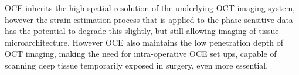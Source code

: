 OCE inherits the high spatial resolution of the underlying OCT imaging system, however the strain estimation process that is applied to the phase-sensitive data has the potential to degrade this slightly, but still allowing imaging of tissue microarchitecture. However OCE also maintains the low penetration depth of OCT imaging, making the need for intra-operative OCE set ups, capable of scanning deep tissue temporarily exposed in surgery, even more essential. 
